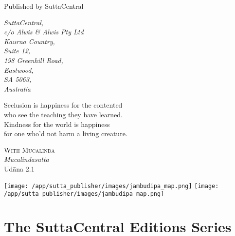 \documentclass[12pt,openany]{book}%
\newcommand{\blankpage}{
\newpage
\thispagestyle{empty}
\mbox{}
\newpage
}
\newcommand*{\epigraphTranslatedTitle}[1]{\vspace*{.5em}\footnotesize\textsc{#1}\\}%
\newcommand*{\epigraphRootTitle}[1]{\footnotesize\textit{#1}\\}%
\newcommand*{\epigraphReference}[1]{\footnotesize{#1}}%
\begin{document}
\begin{footnotesize}
\medskip

Published by SuttaCentral

\medskip

\textit{SuttaCentral,\\
c/o Alwis \& Alwis Pty Ltd\\
Kaurna Country,\\
Suite 12,\\
198 Greenhill Road,\\
Eastwood,\\
SA 5063,\\
Australia}

\end{footnotesize}

\newpage

\setlength{\parindent}{1em}%
\newpage

\vspace*{\fill}

\begin{center}
\epigraph{Seclusion is happiness for the contented\\
who see the teaching they have learned.\\
Kindness for the world is happiness\\
for one who’d not harm a living creature.}
{
\epigraphTranslatedTitle{With Mucalinda}
\epigraphRootTitle{Mucalindasutta}
\epigraphReference{\textsanskrit{Udāna} 2.1}
}
\end{center}

\vspace*{2in}

\vspace*{\fill}

\setlength{\parindent}{0em}
\sbox{}%
\texttt{[image: /app/sutta\_publisher/images/jambudipa\_map.png]}
\newpage
\texttt{[image: /app/sutta\_publisher/images/jambudipa\_map.png]}
\newpage
\restoregeometry

\blankpage%

\setlength{\parindent}{1em}
%
\tableofcontents
\newpage
\pagestyle{fancy}
%
\chapter*{The SuttaCentral Editions Series}
\end{document}
